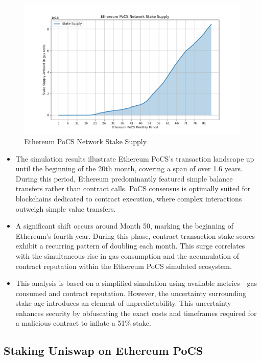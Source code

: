 \documentclass{article}
\begin{document}
\begin{figure}[h]
    \centering
    \includegraphics[width=\textwidth]{./assets/eth-pocs-supply.png}
    \caption{Ethereum PoCS Network Stake Supply}
\end{figure}

\begin{itemize}
    \item The simulation results illustrate Ethereum PoCS's transaction landscape up until the beginning of the 20th month, covering a span of over 1.6 years. During this period, Ethereum predominantly featured simple balance transfers rather than contract calls. PoCS consensus is optimally suited for blockchains dedicated to contract execution, where complex interactions outweigh simple value transfers.
    \item A significant shift occurs around Month 50, marking the beginning of Ethereum’s fourth year. During this phase, contract transaction stake scores exhibit a recurring pattern of doubling each month. This surge correlates with the simultaneous rise in gas consumption and the accumulation of contract reputation within the Ethereum PoCS simulated ecosystem.
    \item This analysis is based on a simplified simulation using available metrics—gas consumed and contract reputation. However, the uncertainty surrounding stake age introduces an element of unpredictability. This uncertainty enhances security by obfuscating the exact costs and timeframes required for a malicious contract to inflate a 51\% stake.
\end{itemize}

\subsection{Staking Uniswap on Ethereum PoCS}
\end{document}
